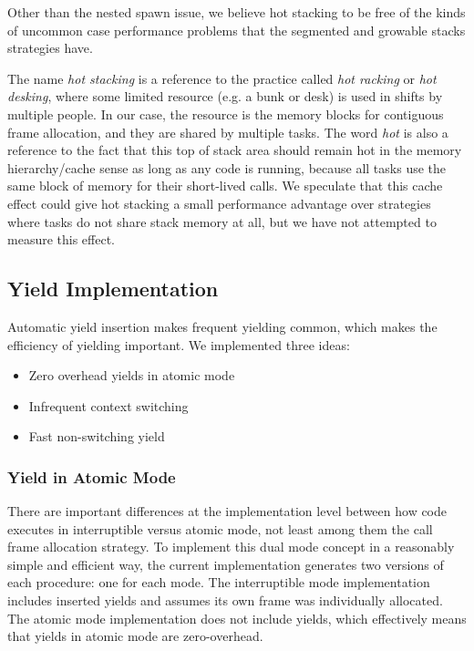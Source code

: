 \documentclass[acmsmall,anonymous,review]{acmart}\settopmatter{printfolios=true,printccs=false,printacmref=false}
\begin{document}
Other than the nested spawn issue, we believe hot stacking to be free of the kinds of uncommon case performance problems that the segmented and growable stacks strategies have.

The name \emph{hot stacking} is a reference to the practice called \emph{hot racking} or \emph{hot desking}, where some limited resource (e.g. a bunk or desk) is used in shifts by multiple people.
In our case, the resource is the memory blocks for contiguous frame allocation, and they are shared by multiple tasks.
The word \emph{hot} is also a reference to the fact that this top of stack area should remain hot in the memory hierarchy/cache sense as long as any code is running, because all tasks use the same block of memory for their short-lived calls.
We speculate that this cache effect could give hot stacking a small performance advantage over strategies where tasks do not share stack memory at all, but we have not attempted to measure this effect.


\subsection{Yield Implementation}
\label{sec:yield_imp}

Automatic yield insertion makes frequent yielding common, which makes the efficiency of yielding important.
We implemented three ideas:

\begin{itemize}
\item Zero overhead yields in atomic mode
\item Infrequent context switching
\item Fast non-switching yield
\end{itemize}

\subsubsection{Yield in Atomic Mode}

There are important differences at the implementation level between how code executes in interruptible versus atomic mode, not least among them the call frame allocation strategy.
To implement this dual mode concept in a reasonably simple and efficient way, the current \charcoal{} implementation generates two versions of each procedure: one for each mode.
The interruptible mode implementation includes inserted yields and assumes its own frame was individually allocated.
The atomic mode implementation does not include yields, which effectively means that yields in atomic mode are zero-overhead.
\end{document}

